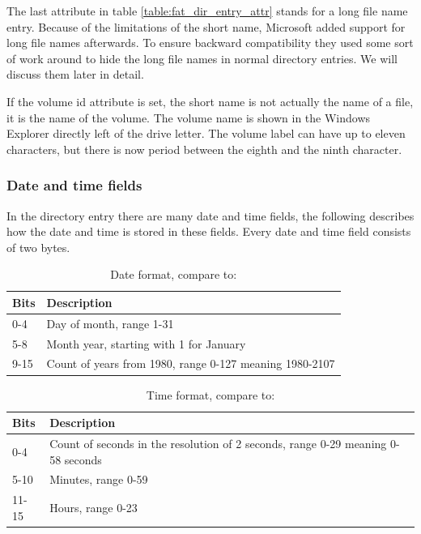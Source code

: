 The last attribute in table \ref{table:fat_dir_entry_attr} stands for a long file name entry. Because of the limitations of the short name, Microsoft added support for long file names afterwards. To ensure backward compatibility they used some sort of work around to hide the long file names in normal directory entries. We will discuss them later in detail.

If the volume id attribute is set, the short name is not actually the name of a file, it is the name of the volume. The volume name is shown in the Windows Explorer directly left of the drive letter. The volume label can have up to eleven characters, but there is now period between the eighth and the ninth character.

\subsubsection{Date and time fields}

In the directory entry there are many date and time fields, the following describes how the date and time is stored in these fields. Every date and time field consists of two bytes. 

\begin{table}[!ht]
\caption{Date format, compare to: \cite{usb_ms_jan, fatgen103}}
\centering
\begin{tabular}{|l|p{9cm}|}
\hline\hline
\textbf{Bits} & \textbf{Description}\\ \hline
0-4 & Day of month, range 1-31 \\ \hline
5-8 & Month year, starting with 1 for January \\ \hline
9-15 & Count of years from 1980, range 0-127 meaning 1980-2107 \\ \hline
\end{tabular}
\label{table:fat_dir_entry_date}
\end{table}

\begin{table}[!ht]
\caption{Time format, compare to: \cite{usb_ms_jan, fatgen103}}
\centering
\begin{tabular}{|l|p{9cm}|}
\hline\hline
\textbf{Bits} & \textbf{Description} \\ \hline
0-4 & Count of seconds in the resolution of 2 seconds, range 0-29 meaning 0-58 seconds \\ \hline
5-10 & Minutes, range 0-59 \\ \hline
11-15 & Hours, range 0-23 \\ \hline
\end{tabular}
\label{table:fat_dir_entry_time}
\end{table}

